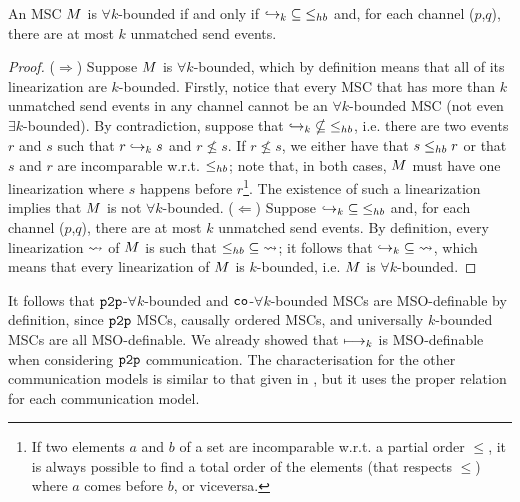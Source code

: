 \begin{proposition}
	An MSC $M$ is $\forall k$-bounded if and only if $\hookrightarrow_{k} \;\subseteq\; \leq_{hb}$ and, for each channel ($p$,$q$), there are at most $k$ unmatched send events.
\end{proposition}
\begin{proof}
	($\Rightarrow$) Suppose $M$ is $\forall k$-bounded, which by definition means that all of its linearization are $k$-bounded. Firstly, notice that every MSC that has more than $k$ unmatched send events in any channel cannot be an $\forall k$-bounded MSC (not even $\exists k$-bounded). By contradiction, suppose that $\hookrightarrow_{k} \;\nsubseteq\; \leq_{hb}$, i.e. there are two events $r$ and $s$ such that $r \hookrightarrow_{k} s$ and $r \nleq s$. If $r \nleq s$, we either have that $s \leq_{hb} r$ or that $s$ and $r$ are incomparable w.r.t. $\leq_{hb}$; note that, in both cases, $M$ must have one linearization where $s$ happens before $r$\footnote{If two elements $a$ and $b$ of a set are incomparable w.r.t. a partial order $\le$, it is always possible to find a total order of the elements (that respects $\le$) where $a$ comes before $b$, or viceversa.}. The existence of such a linearization implies that $M$ is not $\forall k$-bounded.
	($\Leftarrow$) Suppose $\hookrightarrow_{k} \;\subseteq\; \leq_{hb}$ and, for each channel ($p$,$q$), there are at most $k$ unmatched send events. By definition, every linearization $\rightsquigarrow$ of $M$ is such that $\leq_{hb} \;\subseteq\; \rightsquigarrow$; it follows that $\hookrightarrow_{k} \;\subseteq\; \rightsquigarrow$, which means that every linearization of $M$ is $k$-bounded, i.e. $M$ is $\forall k$-bounded.
\end{proof}

It follows that $\mathtt{p2p}$-$\forall k$-bounded and $\mathtt{co}$-$\forall k$-bounded MSCs are MSO-definable by definition, since $\mathtt{p2p}$ MSCs, causally ordered MSCs, and universally $k$-bounded MSCs are all MSO-definable. We already showed that $\longmapsto_k$ is MSO-definable when considering $\mathtt{p2p}$ communication. The characterisation for the other communication models is similar to that given in \cite{DBLP:conf/fossacs/LohreyM02}, but it uses the proper relation for each communication model.

